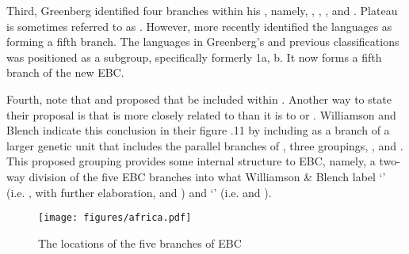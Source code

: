 \documentclass[output=paper]{langsci/langscibook}
\begin{document}
Third, Greenberg identified four branches within his , namely, , , , and  \citep[8-9]{Greenberg1966}. Plateau is sometimes referred to as  \citep{Gerhardt1989}. However, more recently    \citet[31]{WilliamsonBlench2000} identified the  languages as forming a fifth branch. The  languages in Greenberg’s and previous classifications was positioned as a  subgroup, specifically formerly  1a, b. It now forms a fifth branch of the new EBC.

Fourth, \citet[31-32]{WilliamsonBlench2000} note that \citet{Shimizu1975} and \citet{Gerhardt1989} proposed that  be included within . Another way to state their proposal is that  is more closely related to  than it is to  or . Williamson and Blench indicate this conclusion in their figure .11 \citet[31]{WilliamsonBlench2000} by including  as a branch of a larger genetic unit that includes the parallel branches of , three  groupings, , and . This proposed grouping provides some internal structure to  EBC, namely, a two-way division of the five EBC branches into what Williamson \& Blench label ‘’ (i.e. ,  with further elaboration, and ) and ‘’ (i.e.  and ).

\begin{figure}[b!]
\texttt{[image: figures/africa.pdf]}
\caption{\label{fig:watters:1} The locations of the five branches of EBC}
\end{figure}
\end{document}
